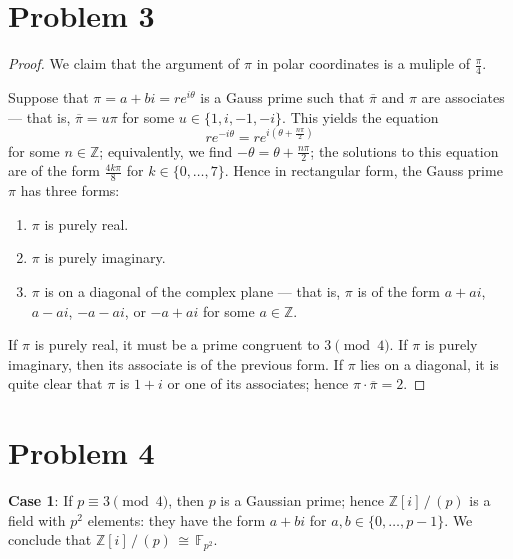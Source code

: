 \documentclass[11pt]{article}
\newcommand{\conjugate}[1]{\overline{#1}}
\begin{document}

\section{Problem 3}

\begin{proof}
  We claim that the argument of $\pi$ in polar coordinates is a muliple of $\tfrac{\pi}{4}$.

  Suppose that $\pi = a + bi = r e^{i \theta}$ is a Gauss prime such that $\conjugate{\pi}$ and $\pi$ are associates --- that is, $\conjugate{\pi} = u \pi$ for some $u \in \{ 1, i, -1, -i \}$. This yields the equation
  \[
    r e^{-i \theta} = r e^{i \left( \theta + \tfrac{n \pi}{2} \right) }
  \]
  for some $n \in \mathbb{Z}$; equivalently, we find $-\theta = \theta + \tfrac{n \pi}{2}$; the solutions to this equation are of the form $\tfrac{4 k \pi}{8}$ for $k \in \{ 0, \ldots, 7 \}$. Hence in rectangular form, the Gauss prime $\pi$ has three forms:
  \begin{enumerate}
    \item $\pi$ is purely real.
    \item $\pi$ is purely imaginary.
    \item $\pi$ is on a diagonal of the complex plane --- that is, $\pi$ is of the form $a + ai$, $a - ai$, $-a - ai$, or $-a + ai$ for some $a \in \mathbb{Z}$.
  \end{enumerate}
  
  If $\pi$ is purely real, it must be a prime congruent to $3 \pmod{4}$. If $\pi$ is purely imaginary, then its associate is of the previous form. If $\pi$ lies on a diagonal, it is quite clear that $\pi$ is $1 + i$ or one of its associates; hence $\pi \cdot \conjugate{\pi} = 2$.
\end{proof}


\section{Problem 4}

\textbf{Case 1}: If $p \equiv 3 \pmod{4}$, then $p$ is a Gaussian prime; hence $\mathbb{Z}[i] \, / \, (p)$ is a field with $p^{2}$ elements: they have the form $a + bi$ for $a, b \in \{ 0, \ldots, p - 1 \}$. We conclude that $\boxed{\mathbb{Z}[i] \, / \, (p) \, \cong \, \mathbb{F}_{p^{2}}}$.
\end{document}
